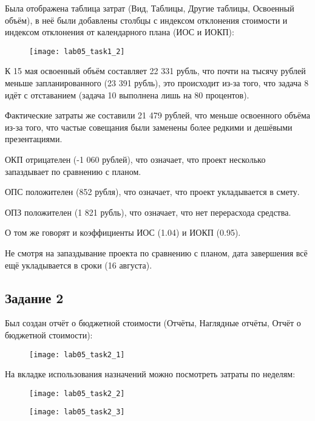 Была отображена таблица затрат (Вид, Таблицы, Другие таблицы, Освоенный объём), в неё были добавлены столбцы с индексом отклонения стоимости и индексом отклонения от календарного плана (ИОС и  ИОКП):

\begin{figure}[h!]
	\texttt{[image: lab05\_task1\_2]}
\end{figure}

\clearpage

К 15 мая освоенный объём составляет 22 331 рубль, что почти на тысячу рублей меньше запланированного (23 391 рубль), это происходит из-за того, что задача 8 идёт с отставанием (задача 10 выполнена лишь на 80 процентов).

Фактические затраты же составили 21 479 рублей, что меньше освоенного объёма из-за того, что частые совещания были заменены более редкими и дешёвыми презентациями.

ОКП отрицателен (-1 060 рублей), что означает, что проект несколько запаздывает по сравнению с планом.

ОПС положителен (852 рубля), что означает, что проект укладывается в смету.

ОПЗ положителен (1 821 рубль), что означает, что нет перерасхода средства. 

О том же говорят и коэффициенты ИОС (1.04) и ИОКП (0.95).

Не смотря на запаздывание проекта по сравнению с планом, дата завершения всё ещё укладывается в сроки (16 августа).


\subsection*{Задание 2}

Был создан отчёт о бюджетной стоимости (Отчёты, Наглядные отчёты, Отчёт о бюджетной стоимости):

\begin{figure}[h!]
	\texttt{[image: lab05\_task2\_1]}
\end{figure}

На вкладке использования назначений можно посмотреть затраты по неделям:
\begin{figure}[h!]
	\texttt{[image: lab05\_task2\_2]}
\end{figure}

\begin{figure}[h!]
	\texttt{[image: lab05\_task2\_3]}
\end{figure}

